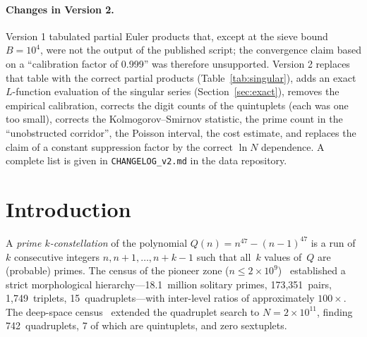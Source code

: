 ﻿\documentclass[11pt,a4paper]{article}
\begin{document}
\paragraph{Changes in Version 2.}
Version 1 \cite{Chen2026c} tabulated partial Euler products that, except at the
sieve bound $B = 10^4$, were not the output of the published script; the
convergence claim based on a ``calibration factor of 0.999'' was therefore
unsupported.  Version 2 replaces that table with the correct partial products
(Table~\ref{tab:singular}), adds an exact $L$-function evaluation of the singular
series (Section~\ref{sec:exact}), removes the empirical calibration, corrects the
digit counts of the quintuplets (each was one too small), corrects the
Kolmogorov--Smirnov statistic, the prime count in the ``unobstructed corridor'',
the Poisson interval, the cost estimate, and replaces the claim of a constant
suppression factor by the correct $\ln N$ dependence.  A complete list is given in
\texttt{CHANGELOG\_v2.md} in the data repository.

\section{Introduction}

A \emph{prime $k$-constellation} of the polynomial
$Q(n) = n^{47} - (n{-}1)^{47}$ is a run of~$k$ consecutive integers
$n, n{+}1, \ldots, n{+}k{-}1$ such that all~$k$ values of~$Q$ are
(probable) primes.  The census of the pioneer zone
($n \leq 2 \times 10^9$)~\cite{Chen2026a} established a strict
morphological hierarchy---18.1~million solitary primes, 173{,}351~pairs,
1{,}749~triplets, 15~quadruplets---with inter-level ratios
of approximately $100{\times}$.  The deep-space census~\cite{Chen2026b}
extended the quadruplet search to $N = 2 \times 10^{11}$, finding
742~quadruplets, 7 of which are quintuplets, and zero sextuplets.
\end{document}
